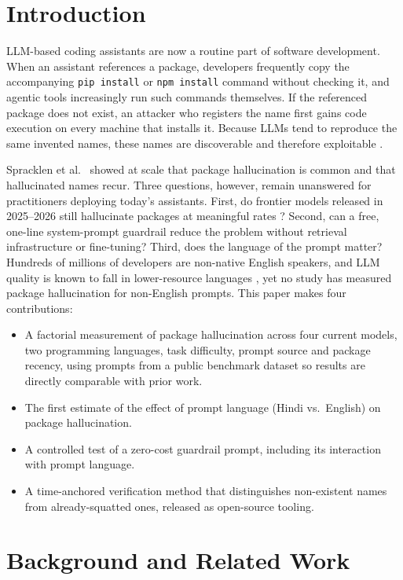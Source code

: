 \documentclass[conference]{IEEEtran}
\begin{document}
\section{Introduction}
LLM-based coding assistants are now a routine part of software development. When an assistant references a package, developers frequently copy the accompanying \texttt{pip install} or \texttt{npm install} command without checking it, and agentic tools increasingly run such commands themselves. If the referenced package does not exist, an attacker who registers the name first gains code execution on every machine that installs it. Because LLMs tend to reproduce the same invented names, these names are discoverable and therefore exploitable \cite{spracklen2025,socket2025}.

Spracklen et al.~\cite{spracklen2025} showed at scale that package hallucination is common and that hallucinated names recur. Three questions, however, remain unanswered for practitioners deploying today's assistants. First, do frontier models released in 2025--2026 still hallucinate packages at meaningful rates \cite{churilov2026}? Second, can a free, one-line system-prompt guardrail reduce the problem without retrieval infrastructure or fine-tuning? Third, does the language of the prompt matter? Hundreds of millions of developers are non-native English speakers, and LLM quality is known to fall in lower-resource languages \cite{mega2023}, yet no study has measured package hallucination for non-English prompts. This paper makes four contributions:
\begin{itemize}
\item A factorial measurement of package hallucination across four current models, two programming languages, task difficulty, prompt source and package recency, using prompts from a public benchmark dataset \cite{spracklen2025,dataset2025} so results are directly comparable with prior work.
\item The first estimate of the effect of prompt language (Hindi vs.\ English) on package hallucination.
\item A controlled test of a zero-cost guardrail prompt, including its interaction with prompt language.
\item A time-anchored verification method that distinguishes non-existent names from already-squatted ones, released as open-source tooling.
\end{itemize}

\section{Background and Related Work}
\end{document}
